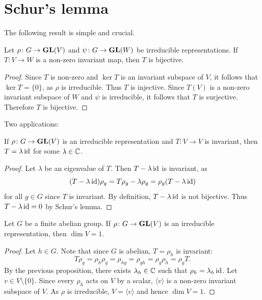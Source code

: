 \section{Schur's lemma}

The following result is simple and crucial. 

\begin{lemma}[Schur]
    Let $\rho\colon G\to\mathbf{GL}(V)$ and $\psi\colon G\to\mathbf{GL}(W)$ be irreducible
    representations. If $T\colon V\to W$ is a non-zero invariant map, then $T$
    is bijective.  
\end{lemma}

\begin{proof}
    Since $T$ is non-zero and $\ker T$ is an invariant subspace of $V$, it
    follows that $\ker T=\{0\}$, as $\rho$ is irreducible. Thus $T$ is
    injective. Since $T(V)$ is a non-zero invariant subspace of $W$ and $\psi$
    is irreducible, it follows that $T$ is surjective. Therefore $T$ is
    bijective.  
\end{proof}

Two applications:

\begin{proposition}
\label{pro:Schur_consequence}
    If $\rho\colon G\to\mathbf{GL}(V)$ is an irreducible representation and $T\colon
    V\to V$ is invariant, then $T=\lambda\operatorname{id}$ for some $\lambda\in\mathbb{C}$. 
\end{proposition}

\begin{proof}
    Let $\lambda$ be an eigenvalue of $T$. Then $T-\lambda\operatorname{id}$ is invariant, as 
    \[
    (T-\lambda\operatorname{id})\rho_g=T\rho_g-\lambda\rho_g=\rho_g(T-\lambda\operatorname{id})
    \]
    for all $g\in G$ since $T$ is invariant. By definition, 
    $T-\lambda\operatorname{id}$ is not bijective. Thus $T-\lambda\operatorname{id}=0$ by Schur's lemma.
\end{proof}

\begin{proposition}
    Let $G$ be a finite abelian group. 
    If $\rho\colon G\to\mathbf{GL}(V)$ is an irreducible representation, then
    $\dim V=1$. 
\end{proposition}

\begin{proof}
    Let $h\in G$. Note that since $G$ is abelian, $T=\rho_h$ is invariant:
    \[
    T\rho_g=\rho_h\rho_g=\rho_{hg}=\rho_{gh}=\rho_g\rho_h=\rho_gT.
    \]
    By the previous proposition, there exists $\lambda_h\in\mathbb{C}$ such that
    $\rho_h=\lambda_h\operatorname{id}$. 
    Let $v\in V\setminus\{0\}$. Since every $\rho_h$ acts on $V$ by a scalar,
    $\langle v\rangle$ is a non-zero invariant subspace of $V$. As $\rho$ is
    irreducible, $V=\langle v\rangle$ and hence $\dim V=1$.
\end{proof}

